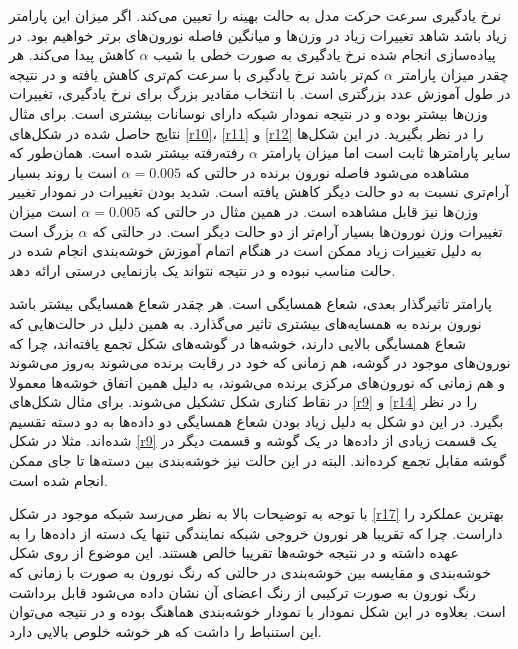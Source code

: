 \documentclass[12pt, a4paper]{article}
\begin{document}
نرخ یادگیری سرعت حرکت مدل به حالت بهینه را تعیین می‌کند. اگر میزان این پارامتر زیاد باشد شاهد تغییرات زیاد در
وزن‌ها و میانگین فاصله نورون‌های برتر خواهیم بود. در پیاده‌سازی انجام شده نرخ یادگیری به صورت خطی با شیب $\alpha$ کاهش پیدا می‌کند.
هر چقدر میزان پارامتر $\alpha$ کم‌تر باشد نرخ یادگیری با سرعت کم‌تری کاهش یافته و در نتیجه در طول آموزش عدد بزرگتری است.
با انتخاب مقادیر بزرگ برای نرخ یادگیری، تغییرات وزن‌ها بیشتر بوده و در نتیجه نمودار شبکه دارای نوسانات بیشتری است.
برای مثال نتایج حاصل شده در شکل‌های \ref{r10}، \ref{r11} و \ref{r12} را در نظر بگیرید. در این شکل‌ها سایر پارامتر‌ها
ثابت است اما میزان پارامتر $\alpha$ رفته‌رفته بیشتر شده است. همان‌طور که مشاهده می‌شود فاصله نورون برنده در حالتی
که $\alpha=0.005$ است با روند بسیار آرام‌تری نسبت به دو حالت دیگر کاهش یافته است. شدید بودن تغییرات در نمودار
تغییر وزن‌ها نیز قابل مشاهده است. در همین مثال در حالتی که $\alpha=0.005$ است میزان تغییرات وزن نورون‌ها بسیار
آرام‌تر از دو حالت دیگر است. در حالتی که $\alpha$ بزرگ است به دلیل تغییرات زیاد ممکن است در هنگام اتمام آموزش
خوشه‌بندی انجام شده در حالت مناسب نبوده و در نتیجه نتواند یک بازنمایی درستی ارائه دهد.

پارامتر تاثیرگذار بعدی، شعاع همسایگی است. هر چقدر شعاع همسایگی بیشتر باشد نورون‌ برنده به همسایه‌های بیشتری تاثیر‌
می‌گذارد. به همین دلیل در حالت‌هایی که شعاع همسایگی بالایی دارند، خوشه‌ها در گوشه‌های شکل تجمع یافته‌اند، چرا که
نورون‌های موجود در گوشه، هم زمانی که خود در رقابت برنده می‌شوند به‌روز‌ می‌شوند و هم زمانی که نورون‌های مرکزی برنده می‌شوند،
به دلیل همین اتفاق خوشه‌ها معمولا در نقاط کناری شکل تشکیل می‌شوند. برای مثال شکل‌های
\ref{r9} و \ref{r14} را در نظر بگیرد. در این دو شکل به دلیل زیاد بودن شعاع همسایگی دو داده‌ها به دو دسته‌ تقسیم شده‌اند.
مثلا در شکل \ref{r9} یک قسمت زیادی از داده‌ها در یک گوشه و قسمت دیگر در گوشه مقابل تجمع کرده‌اند. البته در این حالت
نیز خوشه‌بندی بین دسته‌ها تا جای ممکن انجام شده است.

با توجه به توضیحات بالا به نظر می‌رسد شبکه موجود در شکل‌ \ref{r17} بهترین عملکرد را داراست. چرا که تقریبا
هر نورون خروجی شبکه  نمایندگی تنها یک دسته از داده‌ها را به عهده داشته و در نتیجه خوشه‌ها تقریبا خالص هستند.
این موضوع از روی شکل خوشه‌بندی و مقایسه بین خوشه‌بندی در حالتی که رنگ نورون به صورت  با زمانی که رنگ
نورون به صورت ترکیبی از رنگ اعضای آن نشان داده می‌شود قابل برداشت است. بعلاوه در این شکل‌ نمودار 
با نمودار خوشه‌بندی هماهنگ بوده و در نتیجه می‌توان این استنباط را داشت که هر خوشه خلوص بالایی دارد.

\clearpage
\end{document}
